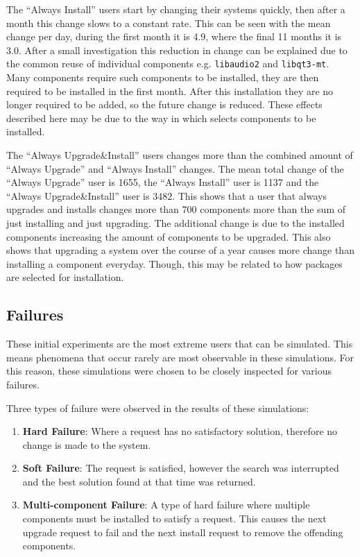 The ``Always Install'' users start by changing their systems quickly, then after a month this change slows to a constant rate.
This can be seen with the mean change per day, during the first month it is 4.9, where the final 11 months it is 3.0.
After a small investigation this reduction in change can be explained due to the common reuse of individual components e.g. \texttt{libaudio2} and \texttt{libqt3-mt}.
Many components require such components to be installed, they are then required to be installed in the first month.
After this installation they are no longer required to be added, so the future change is reduced. 
These effects described here may be due to the way in which \usermodel selects components to be installed.

The ``Always Upgrade\&Install'' users changes more than the combined amount of ``Always Upgrade'' and ``Always Install'' changes.
The mean total change of the ``Always Upgrade'' user is 1655, the ``Always Install'' user is 1137 and the ``Always Upgrade\&Install'' user is 3482.
This shows that a user that always upgrades and installs changes more than 700 components more than the sum of just installing and just upgrading.
The additional change is due to the installed components increasing the amount of components to be upgraded.
This also shows that upgrading a system over the course of a year causes more change than installing a component everyday.
Though, this may be related to how packages are selected for installation.

\subsection{Failures}
These initial experiments are the most extreme users that can be simulated.
This means phenomena that occur rarely are most observable in these simulations.
For this reason, these simulations were chosen to be closely inspected for various failures.

Three types of failure were observed in the results of these simulations:
\begin{enumerate}
  \item \textbf{Hard Failure}: Where a request has no satisfactory solution, therefore no change is made to the system.
  \item \textbf{Soft Failure}: The request is satisfied, however the search was interrupted and the best solution found at that time was returned.
  \item \textbf{Multi-component Failure}: A type of hard failure where multiple components must be installed to satisfy a request. 
  This causes the next upgrade request to fail and the next install request to remove the offending components.
\end{enumerate}

